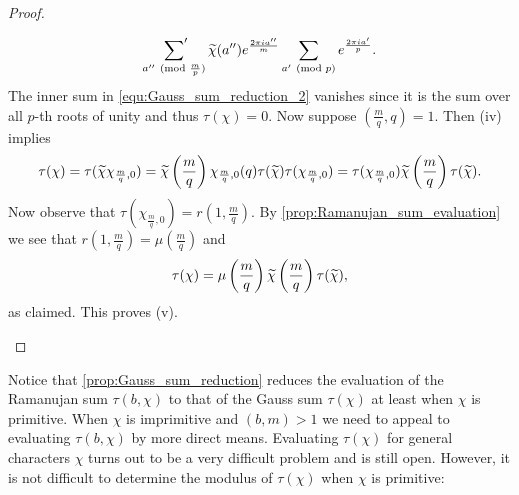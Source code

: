 \begin{proof}
\begin{enumerate}[label*=(\roman*)]
          \begin{equation}\label{equ:Gauss_sum_reduction_2}
            \sideset{}{'}\sum_{a'' \ (\mathrm{mod}\text{ }\frac{m}{p})}\widetilde{\chi}(a'')e^{\frac{2\pi ia''}{m}}\sum_{a' \ (\mathrm{mod}\text{ }p)}e^{\frac{2\pi ia'}{p}}.
          \end{equation}
          The inner sum in \cref{equ:Gauss_sum_reduction_2} vanishes since it is the sum over all $p$-th roots of unity and thus $\tau(\chi) = 0$. Now suppose $\left(\frac{m}{q},q\right) = 1$. Then (iv) implies
          \[
            \tau(\chi) = \tau(\widetilde{\chi}\chi_{\frac{m}{q},0}) = \widetilde{\chi}\left(\frac{m}{q}\right)\chi_{\frac{m}{q},0}(q)\tau(\widetilde{\chi})\tau(\chi_{\frac{m}{q},0}) = \tau(\chi_{\frac{m}{q},0})\widetilde{\chi}\left(\frac{m}{q}\right)\tau(\widetilde{\chi}).
          \]
          Now observe that $\tau(\chi_{\frac{m}{q},0}) = r\left(1,\frac{m}{q}\right)$. By \cref{prop:Ramanujan_sum_evaluation} we see that $r\left(1,\frac{m}{q}\right) = \mu\left(\frac{m}{q}\right)$ and
          \[
            \tau(\chi) = \mu\left(\frac{m}{q}\right)\widetilde{\chi}\left(\frac{m}{q}\right)\tau(\widetilde{\chi}),
          \]
          as claimed. This proves (v).
        \end{enumerate}
      \end{proof}

      Notice that \cref{prop:Gauss_sum_reduction} reduces the evaluation of the Ramanujan sum $\tau(b,\chi)$ to that of the Gauss sum $\tau(\chi)$ at least when $\chi$ is primitive. When $\chi$ is imprimitive and $(b,m) > 1$ we need to appeal to evaluating $\tau(b,\chi)$ by more direct means. Evaluating $\tau(\chi)$ for general characters $\chi$ turns out to be a very difficult problem and is still open. However, it is not difficult to determine the modulus of $\tau(\chi)$ when $\chi$ is primitive:

